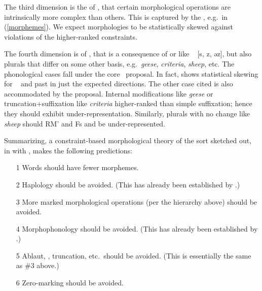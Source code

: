\documentclass[output=paper,
modfonts
]{LSP/langsci}
\begin{document}
The third dimension is the  of , that certain morphological operations are intrinsically more complex than others. This is captured by the , e.g.\ in (\ref{morphemes}). We expect morphologies to be statistically skewed against violations of the higher-ranked constraints.

The fourth dimension is  of ,  that is a consequence of  or  like \e\  [s, z, əz], but also plurals that differ on some other basis, e.g.\ \emph{geese}, \emph{criteria}, \emph{sheep}, etc. The phonological cases fall under the core \io\ proposal. In fact, \citet{inopt} shows statistical skewing for \e\  and past  in just the expected directions. The other case cited is also accommodated by the proposal. Internal modifications like \emph{geese} or truncation+suffixation like \emph{criteria}   higher-ranked  than simple  suffixation; hence they should exhibit under-representation. Similarly, plurals with no change like \emph{sheep} should   RM' and Fs and be under-represented.

Summarizing, a constraint-based morphological theory of the sort sketched out, in  with \io, makes the following predictions:

\begin{exe}
\ex \begin{itemize}
\item[1] Words should have fewer morphemes.

\item[2] Haplology should be avoided. (This has already been established by \citealt{inopt.phon}.)

\item[3] More marked morphological operations (per the hierarchy above) should be avoided.

\item[4] Morphophonology should be avoided. (This has already been established by \citealt{inopt}.)

\item[5] Ablaut, , truncation, etc.\ should be avoided. (This is essentially the same as \#3 above.)

\item[6] Zero-marking should be avoided.

\end{itemize}
\end{exe}
\end{document}

